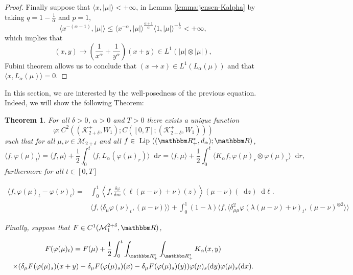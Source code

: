 \documentclass[a4paper,11pt, reqno]{amsart}
\newcommand{\cK}{\mathcal{K}}	\newcommand{\KK}{\mathbbm{K}}
\newcommand{\cM}{\mathcal{M}}	\newcommand{\MM}{\mathbbm{M}}
\newcommand{\dd}{\mathop{}\!\mathrm{d}}
\newcommand{\red}[1]{{\color{red} #1}}
\newcommand{\1}{\mathbbm{1}}
\theoremstyle{plain}
\newtheorem{theorem}{Theorem}[section]
\theoremstyle{definition}
\begin{document}
\begin{proof}
  Finally suppose that $\langle x , | \mu | \rangle < + \infty$, in Lemma
  \ref{lemma:jensen-Kalpha} by taking $q = 1 - \frac{1}{\alpha}$ and $p = 1$,
  \[ \langle x^{- (\alpha - 1)}, | \mu | \rangle \le \langle x^{-
     \alpha}, | \mu | \rangle^{\frac{\alpha + 1}{\alpha}} \langle 1, | \mu |
     \rangle^{- \frac{1}{\alpha}} < + \infty, \]
  which implies that
  \[ (x, y) \rightarrow \left( \frac{1}{x^{\alpha}} + \frac{1}{y^{\alpha}}
     \right) (x + y) \in L^1 (| \mu | \otimes | \mu |), \]
  Fubini theorem allows us to conclude that $(x \rightarrow x) \in L^1
  (L_{\alpha} (\mu))$ and that $\langle x, L_{\alpha} (\mu) \rangle = 0$.
\end{proof}

In this section, we are interested by the well-posedness of the previous
equation. Indeed, we will show the following Theorem:

\red{

\begin{theorem}
  For all $\delta > 0$, $\alpha > 0$ and $T > 0$ there exists a unique
  function
  \[ \varphi : C^2 ((\cK_{2 + \delta}^+, W_1) ; C ([0, T] ;
     (\cK_{2 + \delta}^+, W_1))) \]
  such that for all $\mu, \nu \in \cM_{2 + \delta}$ and all $f \in
   \text{ Lip } ((\RR_+^{\ast}, d_{\alpha}) ; \RR)$,
  \[ \langle f, \varphi (\mu)_t \rangle = \langle f, \mu \rangle + \frac{1}{2}
     \int_0^t \langle f, L_{\alpha} (\varphi (\mu)_r) \rangle \dd r =
     \langle f, \mu \rangle + \frac{1}{2} \int_0^t \langle K_{\alpha} f,
     \varphi (\mu)_r \otimes \varphi (\mu)_r \rangle \dd r, \]
  furthermore for all $t \in [0, T]$
  
  \begin{align*}
    \langle f, \varphi (\mu)_t - \varphi (\nu)_t \rangle = & \int_0^1
    \left\langle f, \frac{\delta \varphi}{\delta m} (\ell (\mu - \nu) + \nu)
    (z) \right\rangle (\mu - \nu) (\dd z) \dd \ell .\\
    & \langle f, \langle \delta_{\mu} \varphi (\nu)_t, (\mu - \nu) \rangle
    \rangle + \int_0^1 (1 - \lambda) \langle f, \langle \delta_{\mu \mu}^2
    \varphi (\lambda (\mu - \nu) + \nu)_t, (\mu - \nu)^{\otimes 2} \rangle
    \rangle
  \end{align*}
  
  Finally, suppose that $F \in C^1 (\cM_1^{2 + \delta}, \RR)$,
  
  \begin{multline*}
    F (\varphi (\mu)_t) = F (\mu) + \frac{1}{2} \int_0^t
    \int_{\RR^{\ast}_+} \int_{\RR^{\ast}_+} K_{\alpha} (x, y)\\
    \times (\delta_{\mu} F (\varphi (\mu)_s) (x + y) - \delta_{\mu} F (\varphi
    (\mu)_s) (x) - \delta_{\mu} F (\varphi (\mu)_s) (y)) \varphi (\mu)_s
    (\dd y) \varphi (\mu)_s (\dd x) .
  \end{multline*}
\end{theorem}}
\end{document}
